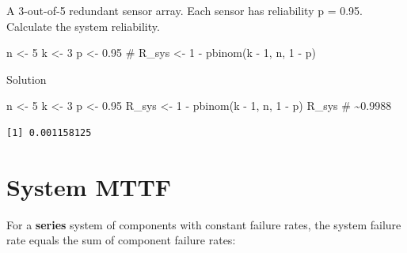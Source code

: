 \documentclass[
  letterpaper,
  DIV=11,
  numbers=noendperiod]{scrreprt}
\newenvironment{Shaded}{\begin{snugshade}}{\end{snugshade}}
\newcommand{\CommentTok}[1]{\textcolor[rgb]{0.37,0.37,0.37}{#1}}
\newcommand{\DecValTok}[1]{\textcolor[rgb]{0.68,0.00,0.00}{#1}}
\newcommand{\FloatTok}[1]{\textcolor[rgb]{0.68,0.00,0.00}{#1}}
\newcommand{\FunctionTok}[1]{\textcolor[rgb]{0.28,0.35,0.67}{#1}}
\newcommand{\NormalTok}[1]{\textcolor[rgb]{0.00,0.23,0.31}{#1}}
\newcommand{\OtherTok}[1]{\textcolor[rgb]{0.00,0.23,0.31}{#1}}
\newcommand{\SpecialCharTok}[1]{\textcolor[rgb]{0.37,0.37,0.37}{#1}}
\begin{document}
\begin{tcolorbox}[enhanced jigsaw, arc=.35mm, bottomrule=.15mm, bottomtitle=1mm, breakable, colback=white, colbacktitle=quarto-callout-note-color!10!white, colframe=quarto-callout-note-color-frame, coltitle=black, left=2mm, leftrule=.75mm, opacityback=0, opacitybacktitle=0.6, rightrule=.15mm, title=\textcolor{quarto-callout-note-color}{\faInfo}\hspace{0.5em}{Try It}, titlerule=0mm, toprule=.15mm, toptitle=1mm]

A 3-out-of-5 redundant sensor array. Each sensor has reliability p =
0.95. Calculate the system reliability.

\begin{Shaded}
\begin{Highlighting}[]
\NormalTok{n }\OtherTok{\textless{}{-}} \DecValTok{5}
\NormalTok{k }\OtherTok{\textless{}{-}} \DecValTok{3}
\NormalTok{p }\OtherTok{\textless{}{-}} \FloatTok{0.95}
\CommentTok{\# R\_sys \textless{}{-} 1 {-} pbinom(k {-} 1, n, 1 {-} p)}
\end{Highlighting}
\end{Shaded}

Solution

\begin{Shaded}
\begin{Highlighting}[]
\NormalTok{n }\OtherTok{\textless{}{-}} \DecValTok{5}
\NormalTok{k }\OtherTok{\textless{}{-}} \DecValTok{3}
\NormalTok{p }\OtherTok{\textless{}{-}} \FloatTok{0.95}
\NormalTok{R\_sys }\OtherTok{\textless{}{-}} \DecValTok{1} \SpecialCharTok{{-}} \FunctionTok{pbinom}\NormalTok{(k }\SpecialCharTok{{-}} \DecValTok{1}\NormalTok{, n, }\DecValTok{1} \SpecialCharTok{{-}}\NormalTok{ p)}
\NormalTok{R\_sys  }\CommentTok{\# \textasciitilde{}0.9988}
\end{Highlighting}
\end{Shaded}

\begin{verbatim}
[1] 0.001158125
\end{verbatim}

\end{tcolorbox}

\section{System MTTF}\label{system-mttf}

For a \textbf{series} system of components with constant failure rates,
the system failure rate equals the sum of component failure rates:
\end{document}

